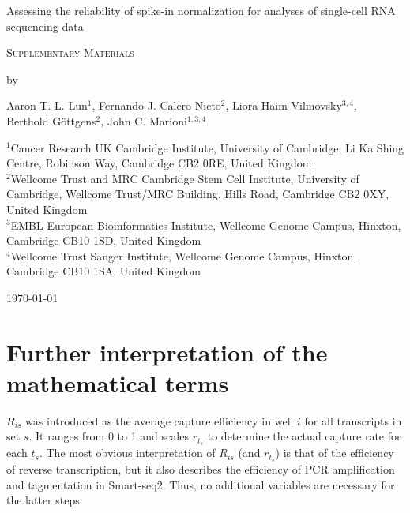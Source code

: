 \documentclass{article}
\begin{document}
\begin{titlepage}
\vspace*{3cm}
\begin{center}

{\LARGE
Assessing the reliability of spike-in normalization for analyses of single-cell RNA sequencing data
\par}

\vspace{0.75cm}

{\Large 
    \textsc{Supplementary Materials}
\par
}
\vspace{0.75cm}

\large
by


\vspace{0.75cm}
Aaron T. L. Lun$^1$, Fernando J. Calero-Nieto$^2$, Liora Haim-Vilmovsky$^{3,4}$, \\
Berthold G\"ottgens$^2$, John C. Marioni$^{1,3,4}$

\vspace{1cm}
\begin{minipage}{0.9\textwidth}
\begin{flushleft} 
$^1$Cancer Research UK Cambridge Institute, University of Cambridge, Li Ka Shing Centre, Robinson Way, Cambridge CB2 0RE, United Kingdom \\[6pt]
$^2$Wellcome Trust and MRC Cambridge Stem Cell Institute, University of Cambridge, Wellcome Trust/MRC Building, Hills Road, Cambridge CB2 0XY, United Kingdom \\[6pt]
$^3$EMBL European Bioinformatics Institute, Wellcome Genome Campus, Hinxton, Cambridge CB10 1SD, United Kingdom \\[6pt]
$^4$Wellcome Trust Sanger Institute, Wellcome Genome Campus, Hinxton, Cambridge CB10 1SA, United Kingdom \\[6pt]
\end{flushleft}
\end{minipage}

\vspace{1.5cm}
{\large \today{}}

\vspace*{\fill}
\end{center}
\end{titlepage}

\newcommand\variance{\mbox{var}}

\section{Further interpretation of the mathematical terms}
$R_{is}$ was introduced as the average capture efficiency in well $i$ for all transcripts in set $s$.
It ranges from 0 to 1 and scales $r_{t_s}$ to determine the actual capture rate for each $t_s$.
The most obvious interpretation of $R_{is}$ (and $r_{t_s}$) is that of the efficiency of reverse transcription, but it also describes the efficiency of PCR amplification and tagmentation in Smart-seq2.
Thus, no additional variables are necessary for the latter steps.
\end{document}
